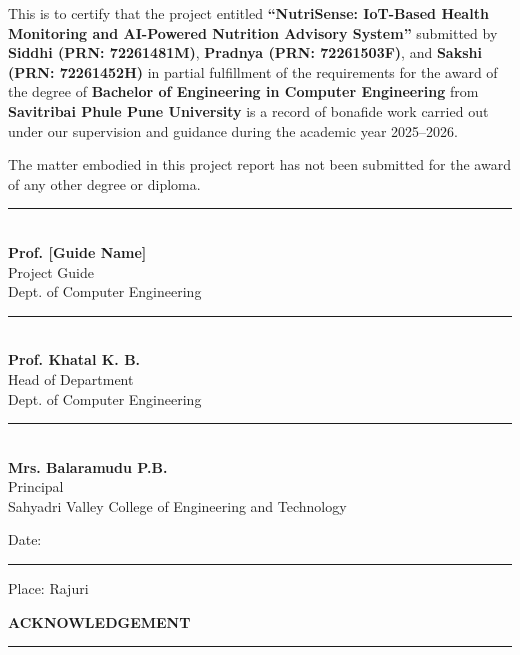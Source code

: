 \documentclass[12pt,a4paper]{report}
\begin{document}
\setlength{\parindent}{2em}
This is to certify that the project entitled \textbf{``NutriSense: IoT-Based Health Monitoring and AI-Powered Nutrition Advisory System''} submitted by \textbf{Siddhi (PRN: 72261481M)}, \textbf{Pradnya (PRN: 72261503F)}, and \textbf{Sakshi (PRN: 72261452H)} in partial fulfillment of the requirements for the award of the degree of \textbf{Bachelor of Engineering in Computer Engineering} from \textbf{Savitribai Phule Pune University} is a record of bonafide work carried out under our supervision and guidance during the academic year 2025--2026.

\vspace{0.5cm}
The matter embodied in this project report has not been submitted for the award of any other degree or diploma.

\vspace{3cm}

\noindent
\begin{minipage}[t]{0.45\textwidth}
\centering
\rule{5cm}{0.4pt}\\
\textbf{Prof. [Guide Name]}\\
Project Guide\\
Dept. of Computer Engineering
\end{minipage}
\hfill
\begin{minipage}[t]{0.45\textwidth}
\centering
\rule{5cm}{0.4pt}\\
\textbf{Prof. Khatal K. B.}\\
Head of Department\\
Dept. of Computer Engineering
\end{minipage}

\vspace{3cm}
\begin{center}
\rule{5cm}{0.4pt}\\
\textbf{Mrs. Balaramudu P.B.}\\
Principal\\
Sahyadri Valley College of Engineering and Technology
\end{center}

\vspace{1cm}
\noindent Date: \rule{3cm}{0.4pt} \hfill Place: Rajuri

\newpage
\thispagestyle{empty}
\begin{center}
{\LARGE\textbf{ACKNOWLEDGEMENT}}\\[0.5cm]
\rule{\textwidth}{1pt}
\end{center}
\vspace{1cm}
\end{document}
